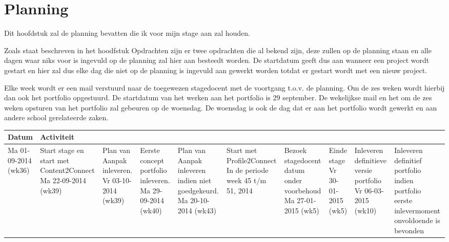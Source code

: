 \section{Planning}
Dit hoofdstuk zal de planning bevatten die ik voor mijn stage aan zal houden.

Zoals staat beschreven in het hoodfstuk Opdrachten zijn er twee opdrachten die al bekend zijn, deze zullen op de planning staan en alle dagen waar niks voor is ingevuld op de planning zal hier aan besteedt worden. De startdatum geeft dus aan wanneer een project wordt gestart en hier zal dus elke dag die niet op de planning is ingevuld aan gewerkt worden totdat er gestart wordt met een nieuw project.

Elke week wordt er een mail verstuurd naar de toegewezen stagedocent met de voortgang t.o.v. de planning. Om de zes weken wordt hierbij dan ook het portfolio opgestuurd. De startdatum van het werken aan het portfolio is 29 september. De wekelijkse mail en het om de zes weken opsturen van het portfolio zal gebeuren op de woensdag. De woensdag is ook de dag dat er aan het portfolio wordt gewerkt en aan andere school gerelateerde zaken.
\begin{tabu} to 0.8\textwidth { | X[l] | X[l] | }
\hline
Datum & Activiteit \\ \hline
Ma 01-09-2014 (wk36) & Start stage en start met Content2Connect
Ma 22-09-2014 (wk39) & Plan van Aanpak inleveren.
Vr 03-10-2014 (wk39) & Eerste concept portfolio inleveren.
Ma 29-09-2014 (wk40) & Plan van Aanpak inleveren indien niet goedgekeurd.
Ma 20-10-2014 (wk43) & Start met Profile2Connect
In de periode week 45 t/m 51, 2014 & Bezoek stagedocent datum onder voorbehoud
Ma 27-01-2015 (wk5) & Einde stage
Vr 30-01-2015 (wk5) & Inleveren definitieve versie portfolio
Vr 06-03-2015 (wk10) & Inleveren definitief portfolio indien portfolio eerste inlevermoment onvoldoende is bevonden
\hline
\end{tabu}


